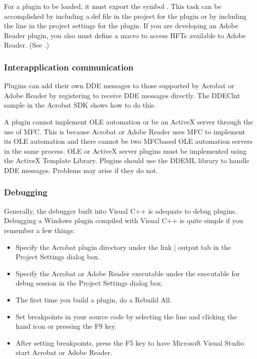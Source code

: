\documentclass[letterpaper,12pt,english,openany,oneside]{sphinxmanual}
\begin{document}
For a plugin to be loaded, it must export the symbol . This task can be accomplished by including a.def file in the project for the plugin or by including the line  in the project settings for the plugin. If you are developing an Adobe Reader plugin, you also must define a macro to access HFTs available to Adobe Reader. (See .)


\subsubsection{Interapplication communication}
\label{\detokenize{Plugins_CreatingSimplePlug:interapplication-communication}}
Plugins can add their own DDE messages to those supported by Acrobat or Adobe Reader by registering to receive DDE messages directly. The DDEClnt sample in the Acrobat SDK shows how to do this.

A plugin cannot implement OLE automation or be an ActiveX server through the use of MFC. This is because Acrobat or Adobe Reader uses MFC to implement its OLE automation and there cannot be two MFC\sphinxhyphen{}based OLE automation servers in the same process. OLE or ActiveX server plugins must be implemented using the ActiveX Template Library. Plugins should use the DDEML library to handle DDE messages. Problems may arise if they do not.


\subsubsection{Debugging}
\label{\detokenize{Plugins_CreatingSimplePlug:debugging}}
Generally, the debugger built into Visual C++ is adequate to debug plugins. Debugging a Windows plugin compiled with Visual C++ is quite simple if you remember a few things:
\begin{itemize}
\item {} 
Specify the Acrobat plugin directory under the link | output tab in the Project Settings dialog box.

\item {} 
Specify the Acrobat or Adobe Reader executable under the executable for debug session in the Project Settings dialog box.

\item {} 
The first time you build a plugin, do a Rebuild All.

\item {} 
Set breakpoints in your source code by selecting the line and clicking the hand icon or pressing the F9 key.

\item {} 
After setting breakpoints, press the F5 key to have Microsoft Visual Studio start Acrobat or Adobe Reader.

\end{itemize}
\end{document}
